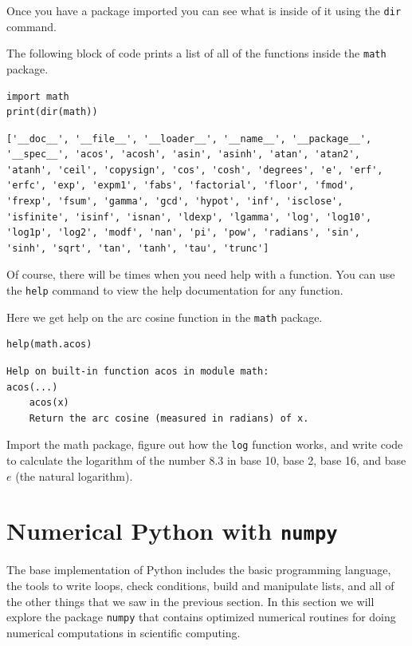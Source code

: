Once you have a package imported you can see what is inside of it using the \texttt{dir}
command.  

\begin{example}
    The following block of code prints a list of all of the functions inside the
\texttt{math} package.

\bcode
\begin{lstlisting}
import math
print(dir(math))
\end{lstlisting}
\boutput
\begin{lstlisting}
['__doc__', '__file__', '__loader__', '__name__', '__package__',
'__spec__', 'acos', 'acosh', 'asin', 'asinh', 'atan', 'atan2', 
'atanh', 'ceil', 'copysign', 'cos', 'cosh', 'degrees', 'e', 'erf', 
'erfc', 'exp', 'expm1', 'fabs', 'factorial', 'floor', 'fmod', 
'frexp', 'fsum', 'gamma', 'gcd', 'hypot', 'inf', 'isclose', 
'isfinite', 'isinf', 'isnan', 'ldexp', 'lgamma', 'log', 'log10', 
'log1p', 'log2', 'modf', 'nan', 'pi', 'pow', 'radians', 'sin', 
'sinh', 'sqrt', 'tan', 'tanh', 'tau', 'trunc']
\end{lstlisting}
\end{example}

Of course, there will be times when you need help with a function.  You can use the
\texttt{help} command to view the help documentation for any function.  

\begin{example}[Help]
    Here we get help on the arc cosine function in the \texttt{math} package.

    \bcode
\begin{lstlisting}
help(math.acos)
\end{lstlisting}
\boutput
\begin{lstlisting}
Help on built-in function acos in module math:
acos(...)
    acos(x)
    Return the arc cosine (measured in radians) of x.
\end{lstlisting}
\end{example}

\begin{problem}
    Import the math package, figure out how the \texttt{log} function works, and write
    code to calculate the logarithm of the number 8.3 in base 10, base 2, base 16, and
    base $e$  (the natural logarithm).
\end{problem}





\section{Numerical Python with \texttt{numpy}}
The base implementation of Python includes the basic programming language, the tools to
write loops, check conditions, build and manipulate lists, and all of the other things
that we saw in the previous section.  In this section we will explore the package
\texttt{numpy} that contains optimized numerical routines for doing numerical computations
in scientific computing.

